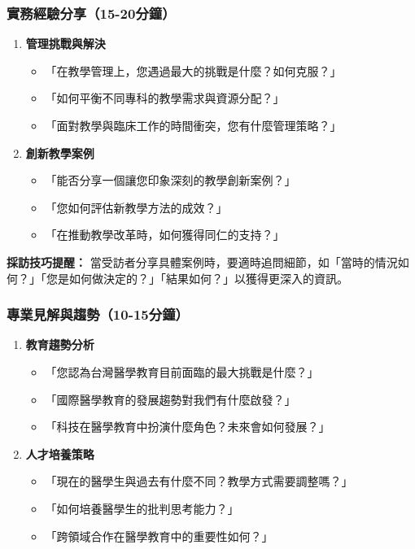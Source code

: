 \documentclass[12pt,a4paper]{article}
\begin{document}
\subsubsection{實務經驗分享（15-20分鐘）}
\begin{enumerate}[nosep]
    \item \textbf{管理挑戰與解決}
    \begin{itemize}[nosep]
        \item 「在教學管理上，您遇過最大的挑戰是什麼？如何克服？」
        \item 「如何平衡不同專科的教學需求與資源分配？」
        \item 「面對教學與臨床工作的時間衝突，您有什麼管理策略？」
    \end{itemize}

    \item \textbf{創新教學案例}
    \begin{itemize}[nosep]
        \item 「能否分享一個讓您印象深刻的教學創新案例？」
        \item 「您如何評估新教學方法的成效？」
        \item 「在推動教學改革時，如何獲得同仁的支持？」
    \end{itemize}
\end{enumerate}

\begin{importantbox}
\textbf{採訪技巧提醒：} 當受訪者分享具體案例時，要適時追問細節，如「當時的情況如何？」「您是如何做決定的？」「結果如何？」以獲得更深入的資訊。
\end{importantbox}

\subsubsection{專業見解與趨勢（10-15分鐘）}
\begin{enumerate}[nosep]
    \item \textbf{教育趨勢分析}
    \begin{itemize}[nosep]
        \item 「您認為台灣醫學教育目前面臨的最大挑戰是什麼？」
        \item 「國際醫學教育的發展趨勢對我們有什麼啟發？」
        \item 「科技在醫學教育中扮演什麼角色？未來會如何發展？」
    \end{itemize}

    \item \textbf{人才培養策略}
    \begin{itemize}[nosep]
        \item 「現在的醫學生與過去有什麼不同？教學方式需要調整嗎？」
        \item 「如何培養醫學生的批判思考能力？」
        \item 「跨領域合作在醫學教育中的重要性如何？」
    \end{itemize}
\end{enumerate}
\end{document}

